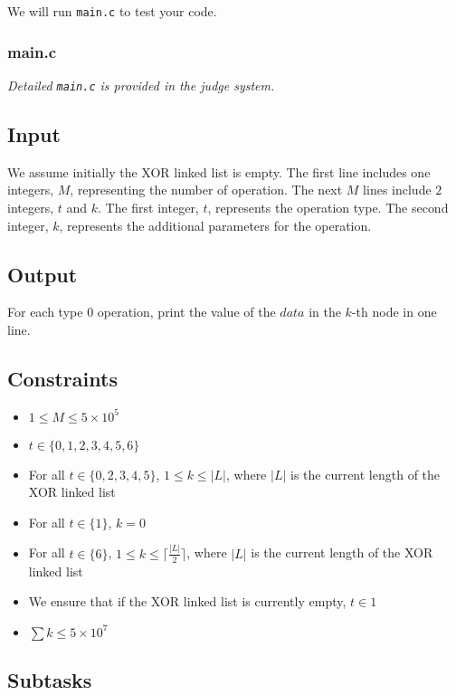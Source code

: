 \noindent We will run \texttt{main.c} to test your code.

\subsubsection{main.c}\label{main.c}

{\it Detailed \texttt{main.c} is provided in the judge system.}

\subsection{Input}\label{input}

We assume initially the XOR linked list is empty. The first line includes one integers, $M$, representing the number of operation. The next $M$ lines include $2$ integers, $t$ and $k$. The first integer, $t$, represents the operation type. The second integer, $k$, represents the additional parameters for the operation.

\subsection{Output}\label{output}

For each type $0$ operation, print the value of the $data$ in the $k$-th node in one line.

\subsection{Constraints}\label{constraint}

\begin{itemize}
    \item $1\leq M\leq 5\times 10^5$
    \item $t\in \{0, 1, 2, 3, 4, 5, 6\}$
    \item For all $t\in \{0, 2, 3, 4, 5\}$, $1\leq k\leq |L|$, where $|L|$ is the current length of the XOR linked list
    \item For all $t\in \{1\}$, $k=0$
    \item For all $t\in \{6\}$, $1\leq k\leq \lceil{\frac{|L|}{2}}\rceil$, where $|L|$ is the current length of the XOR linked list
    \item We ensure that if the XOR linked list is currently empty, $t\in 1$
    \item $\sum k\leq 5\times 10^7$
\end{itemize}

\subsection*{Subtasks}
